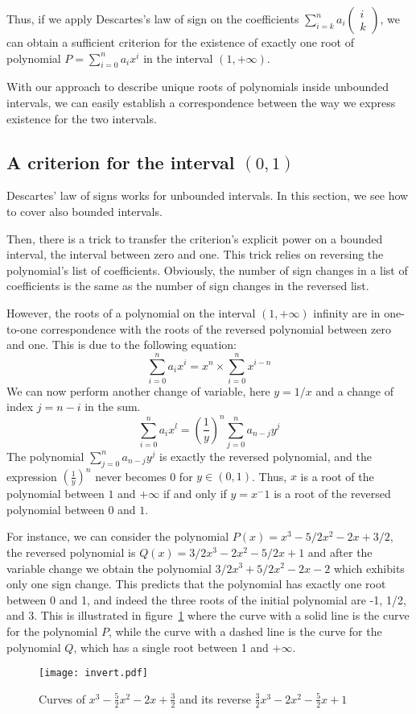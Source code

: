 \documentclass{mscs}
\begin{document}
Thus, if we apply Descartes's law of sign on the coefficients
\(\sum_{i=k}^{n}a_i\left(\begin{array}{c}i\\k\end{array}\right)\), we
can obtain a sufficient criterion for the existence of exactly one
root of polynomial \(P=\sum_{i=0}^{n}a_ix^i\) in the interval
\((1,+\infty)\).

With our approach to describe unique roots of polynomials inside
unbounded intervals, we can easily establish a correspondence between
the way we express existence for the two intervals.
\subsection{A criterion for the interval \((0,1)\)}
Descartes' law of signs works for unbounded intervals.  In this
section, we see how to cover also bounded intervals.

Then, there is a trick to transfer the criterion's explicit power on a
bounded interval, the interval between zero and one. This trick relies
on reversing the polynomial's list of coefficients.  Obviously, the
number of sign changes in a list of coefficients is the same as the
number of sign changes in the reversed list.

However, the roots of a polynomial on the interval \((1,+\infty)\)
infinity are in one-to-one correspondence with the roots of the
reversed polynomial between zero and one. This is due to the following
equation:
\[\sum_{i=0}^{n}a_i x^i = x^n\times\sum_{i=0}^{n}x^{i-n}\]
We can now perform another change of variable, here \(y=1/x\) and a
change of index \(j=n-i\) in the sum.
\[\sum_{i=0}^{n}a_i x^l = (\frac{1}{y})^n \sum_{j=0}^{n}a_{n-j} y^j\]
The polynomial \(\sum_{j=0}^{n} a_{n-j}y^j\) is exactly the reversed
polynomial, and the expression \((\frac{1}{y})^n\) never becomes 0 for
\(y\in (0,1)\).  Thus, \(x\) is a root of the polynomial between \(1\)
and \(+\infty\) if and only if \(y=x^-1\) is a root of the reversed
polynomial between \(0\) and \(1\).

For instance, we can consider the polynomial \(P(x) = x^3 - 5/2 x^2 - 2 x + 3/2\),
the reversed polynomial is \(Q(x) = 3/2 x^3 - 2 x^2 - 5/2 x + 1\) and after
the variable change we obtain the polynomial \(3/2 x^3 + 5/2 x^2 - 2 x - 2\)
which exhibits only one sign change.  This predicts that the polynomial has
exactly one root between 0 and 1, and indeed the three roots of the initial
polynomial are -1, 1/2, and 3.  This is illustrated in
figure~\ref{invert} where the curve with a solid line is the curve for the
polynomial \(P\), while the curve with a dashed line is the curve for
the polynomial \(Q\), which has a single root between 1 and \(+\infty\).
\begin{figure}\label{invert}
\begin{center}
\texttt{[image: invert.pdf]}
\end{center}
\caption{Curves of \(x^3 -\frac{5}{2} x^2 - 2 x +
  \frac{3}{2}\)
and its reverse \(\frac{3}{2}x^3 -2 x^2 - \frac{5}{2} x + 1\)}
\end{figure}
\end{document}
